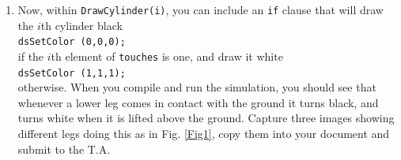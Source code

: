 \documentclass[12pt]{article}
\begin{document}
\begin{enumerate}
\item Now, within \texttt{DrawCylinder(i)}, you can include an \texttt{if} clause that will draw the $i$th cylinder black\\
    \texttt{dsSetColor (0,0,0);}\\
    if the $i$th element of \texttt{touches} is one, and draw it white\\
    \texttt{dsSetColor (1,1,1);}\\
    otherwise. When you compile and run the simulation, you should see that whenever a lower leg comes in contact with the ground it turns black, and turns white when it is lifted above the ground. Capture three images showing different legs doing this as in Fig. \ref{Fig1}, copy them into your document and submit to the T.A.

\end{enumerate}
\end{document}
